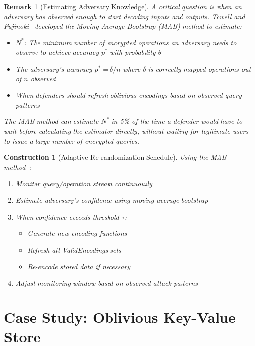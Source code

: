 \documentclass[11pt,final,hidelinks]{article}
\newtheorem{remark}[theorem]{Remark}
\newtheorem{construction}[theorem]{Construction}
\begin{document}
\begin{remark}[Estimating Adversary Knowledge]
A critical question is when an adversary has observed enough to start decoding inputs and outputs. Towell and Fujinoki~\cite{towell2016estimating} developed the Moving Average Bootstrap (MAB) method to estimate:
\begin{itemize}
    \item $N^*$: The minimum number of encrypted operations an adversary needs to observe to achieve accuracy $p^*$ with probability $\theta$
    \item The adversary's accuracy $p^* = \delta/n$ where $\delta$ is correctly mapped operations out of $n$ observed
    \item When defenders should refresh oblivious encodings based on observed query patterns
\end{itemize}
The MAB method can estimate $N^*$ in 5\% of the time a defender would have to wait before calculating the estimator directly, without waiting for legitimate users to issue a large number of encrypted queries.
\end{remark}

\begin{construction}[Adaptive Re-randomization Schedule]
Using the MAB method~\cite{towell2016estimating}:
\begin{enumerate}
    \item Monitor query/operation stream continuously
    \item Estimate adversary's confidence using moving average bootstrap
    \item When confidence exceeds threshold $\tau$:
        \begin{itemize}
            \item Generate new encoding functions
            \item Refresh all ValidEncodings sets
            \item Re-encode stored data if necessary
        \end{itemize}
    \item Adjust monitoring window based on observed attack patterns
\end{enumerate}
\end{construction}

\section{Case Study: Oblivious Key-Value Store}
\end{document}
